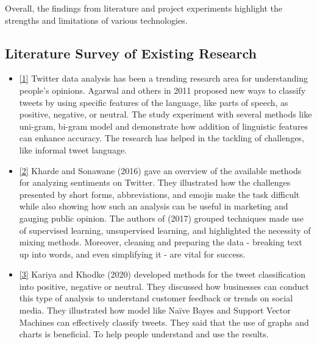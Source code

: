 \documentclass[journal]{IEEEtran}
\begin{document}
Overall, the findings from literature and project experiments highlight the strengths and limitations of various technologies.

\subsection{Literature Survey of Existing Research}
\begin{itemize}
     

\item\href{https://www.cs.columbia.edu/~julia/papers/Agarwaletal11.pdf}{[1]} Twitter data analysis has been a trending research area for understanding people’s opinions. Agarwal and others in 2011 proposed new ways to classify tweets by using specific features of the language, like parts of speech, as positive, negative, or neutral. The study experiment with several methods like uni-gram, bi-gram model and demonstrate how addition of linguistic features can enhance accuracy. The research has helped in the tackling of challenges, like informal tweet language. 

\item\href{https://arxiv.org/pdf/1601.06971}{[2]} Kharde and Sonawane (2016) gave an overview of the available methods for analyzing sentiments on Twitter. They illustrated how the challenges presented by short forms, abbreviations, and emojis make the task difficult while also showing how such an analysis can be useful in marketing and gauging public opinion. The authors of (2017) grouped techniques made use of supervised learning, unsupervised learning, and highlighted the necessity of mixing methods. Moreover, cleaning and preparing the data - breaking text up into words, and even simplifying it - are vital for success.

\item\href{https://ieeexplore.ieee.org/document/9154143}{[3]} Kariya and Khodke (2020) developed methods for the tweet classification into positive, negative or neutral. They discussed how businesses can conduct this type of analysis to understand customer feedback or trends on social media. They illustrated how model like Naïve Bayes and Support Vector Machines can effectively classify tweets. They said that the use of graphs and charts is beneficial. To help people understand and use the results. 


\end{itemize}
\end{document}
